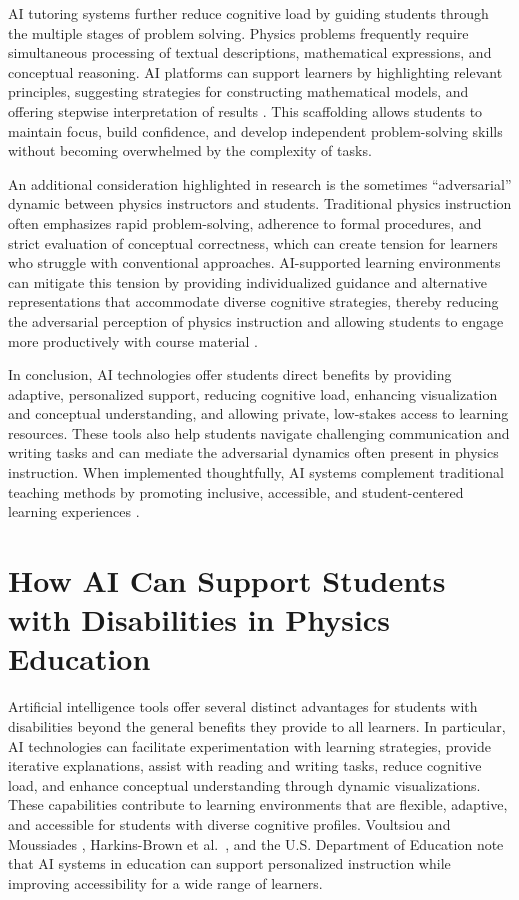 \documentclass[]{aastex701}
\begin{document}
AI tutoring systems further reduce cognitive load by guiding students through the multiple stages of problem solving. Physics problems frequently require simultaneous processing of textual descriptions, mathematical expressions, and conceptual reasoning. AI platforms can support learners by highlighting relevant principles, suggesting strategies for constructing mathematical models, and offering stepwise interpretation of results \autocite{Paglialunga2025, Sweller2011}. This scaffolding allows students to maintain focus, build confidence, and develop independent problem-solving skills without becoming overwhelmed by the complexity of tasks.

An additional consideration highlighted in research is the sometimes ``adversarial'' dynamic between physics instructors and students. Traditional physics instruction often emphasizes rapid problem-solving, adherence to formal procedures, and strict evaluation of conceptual correctness, which can create tension for learners who struggle with conventional approaches. AI-supported learning environments can mitigate this tension by providing individualized guidance and alternative representations that accommodate diverse cognitive strategies, thereby reducing the adversarial perception of physics instruction and allowing students to engage more productively with course material \autocite{Paglialunga2025, Khowaja2025}.

In conclusion, AI technologies offer students direct benefits by providing adaptive, personalized support, reducing cognitive load, enhancing visualization and conceptual understanding, and allowing private, low-stakes access to learning resources. These tools also help students navigate challenging communication and writing tasks and can mediate the adversarial dynamics often present in physics instruction. When implemented thoughtfully, AI systems complement traditional teaching methods by promoting inclusive, accessible, and student-centered learning experiences \autocite{Paglialunga2025, Voultsiou2025, HarkinsBrown2025, Sweller2011, Khowaja2025, Alenezi2025, Finkelstein2005}.


\section{How AI Can Support Students with Disabilities in Physics Education}
\label{sec:AI_Support}
Artificial intelligence tools offer several distinct advantages for students with disabilities beyond the general benefits they provide to all learners. In particular, AI technologies can facilitate experimentation with learning strategies, provide iterative explanations, assist with reading and writing tasks, reduce cognitive load, and enhance conceptual understanding through dynamic visualizations. These capabilities contribute to learning environments that are flexible, adaptive, and accessible for students with diverse cognitive profiles. Voultsiou and Moussiades \autocite{Voultsiou2025}, Harkins-Brown et al.\ \autocite{HarkinsBrown2025}, and the U.S. Department of Education \autocite{USDOE2023} note that AI systems in education can support personalized instruction while improving accessibility for a wide range of learners.
\end{document}
